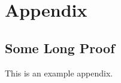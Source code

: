 \chapter{Appendix}
\label{cha:appendix}



\section{Some Long Proof}
\label{sec:some-long-proof}

This is an example appendix.

